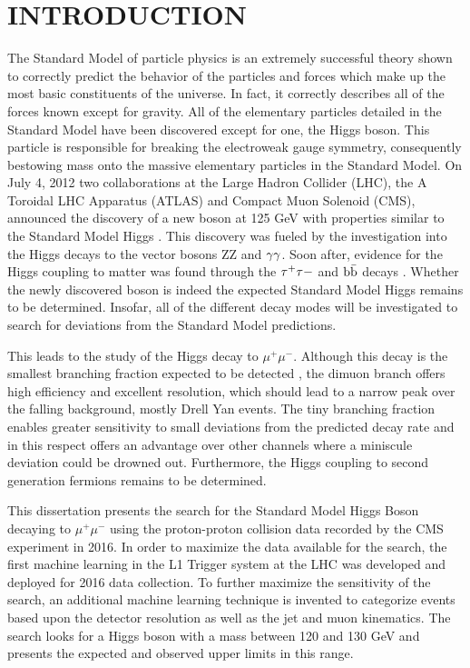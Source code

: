 \chapter{INTRODUCTION} \label{intro}

The Standard Model of particle physics is an extremely successful theory shown to correctly predict the behavior of the particles and forces which make up the most basic constituents of the universe. In fact, it correctly describes all of the forces known except for gravity. All of the elementary particles detailed in the Standard Model have been discovered except for one, the Higgs boson. This particle is responsible for breaking the electroweak gauge symmetry, consequently bestowing mass onto the massive elementary particles in the Standard Model. On July 4, 2012 two collaborations at the Large Hadron Collider (LHC), the A Toroidal LHC Apparatus (ATLAS) and Compact Muon Solenoid (CMS), announced the discovery of a new boson at 125 GeV with properties similar to the Standard Model Higgs \cite{atlasdiscovery,cmsdiscovery2012,cmsdiscovery2013}. This discovery was fueled by the investigation into the Higgs decays to the vector bosons ZZ and ${\rm \gamma\gamma}$. Soon after, evidence for the Higgs coupling to matter was found through the ${\rm \tau^{+}\tau{-}}$ and ${\rm b\bar{b}}$ decays \cite{cmshiggstau,cmshiggsbb,cmshiggsferm,atlashiggsbb}. Whether the newly discovered boson is indeed the expected Standard Model Higgs remains to be determined. Insofar, all of the different decay modes will be investigated to search for deviations from the Standard Model predictions.

This leads to the study of the Higgs decay to $\mu^{+}\mu^{-}$. Although this decay is the smallest branching fraction expected to be detected \cite{smallestbranch1,smallestbranch2}, the dimuon branch offers high efficiency and excellent resolution, which should lead to a narrow peak over the falling background, mostly Drell Yan events. The tiny branching fraction enables greater sensitivity to small deviations from the predicted decay rate and in this respect offers an advantage over other channels where a miniscule deviation could be drowned out. Furthermore, the Higgs coupling to second generation fermions remains to be determined. 

This dissertation presents the search for the Standard Model Higgs Boson decaying to $\mu^{+}\mu^{-}$ using the proton-proton collision data recorded by the CMS experiment in 2016. In order to maximize the data available for the search, the first machine learning in the L1 Trigger system at the LHC was developed and deployed for 2016 data collection. To further maximize the sensitivity of the search, an additional machine learning technique is invented to categorize events based upon the detector resolution as well as the jet and muon kinematics. The search looks for a Higgs boson with a mass between 120 and 130 GeV and presents the expected and observed upper limits in this range. 


